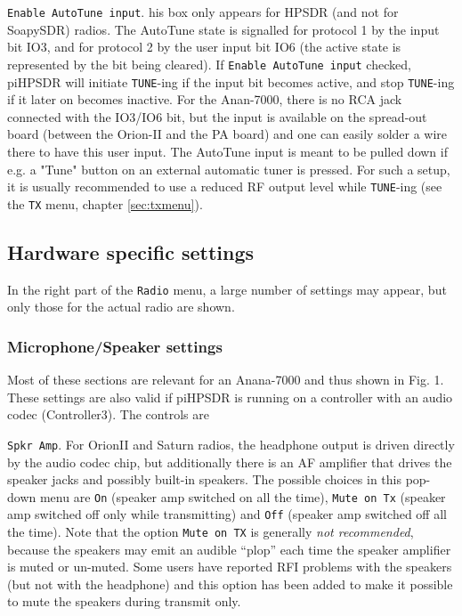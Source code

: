 \documentclass[12pt]{book}
\def\rett#1{\texttt{\color{red}#1}}
\def\bltt#1{\texttt{\color{blue}#1}}
\def\pH{pi\-HPSDR\xspace}
\begin{document}
\rett{Enable AutoTune  input}. his box only appears for HPSDR (and not for SoapySDR)
radios. The AutoTune state is signalled for protocol 1 by the input bit IO3,
and for protocol 2 by the user input bit IO6 (the active state is represented
by the bit being cleared).
If \rett{Enable AutoTune  input} checked, \pH will initiate \bltt{TUNE}-ing if the
input bit becomes active, and stop \bltt{TUNE}-ing if it later on becomes inactive.
For the Anan-7000, there is no RCA jack connected with the IO3/IO6 bit, but the
input is available on the spread-out board (between the Orion-II and the PA board) and one
can easily solder a wire there to have this user input. The AutoTune input is meant to
be pulled down if e.g. a "Tune" button on an external automatic tuner is pressed.
For such a setup, it is usually recommended to use a reduced RF output level while
\bltt{TUNE}-ing  (see the \bltt{TX} menu, chapter \ref{sec:txmenu}).

\subsection{Hardware specific settings}

In the right part of the \bltt{Radio} menu, a large number of settings may appear,
but only those for the actual radio are shown.

\subsubsection{Microphone/Speaker settings}
Most of these sections are relevant for an Anana-7000 and thus shown in Fig. 1. These
settings are also valid if \pH is running on a controller with an audio codec
(Controller3). The controls are

\rett{Spkr Amp}. For OrionII and Saturn radios, the headphone output is driven directly by the audio codec
chip, but additionally there is an AF amplifier that drives the speaker jacks and possibly built-in speakers.
The possible choices in this pop-down menu are \rett{On} (speaker amp switched on all the time),
\rett{Mute on Tx} (speaker amp switched off only while transmitting) and \rett{Off} (speaker amp switched
off all the time). Note that the option \rett{Mute on TX} is generally
\textit{not recommended}, because the
speakers may emit an audible ``plop'' each time the speaker amplifier is muted or un-muted.
Some users have reported RFI problems with the speakers (but not with the headphone)
and this option has been added to make it possible to mute the speakers during transmit only.
\end{document}
